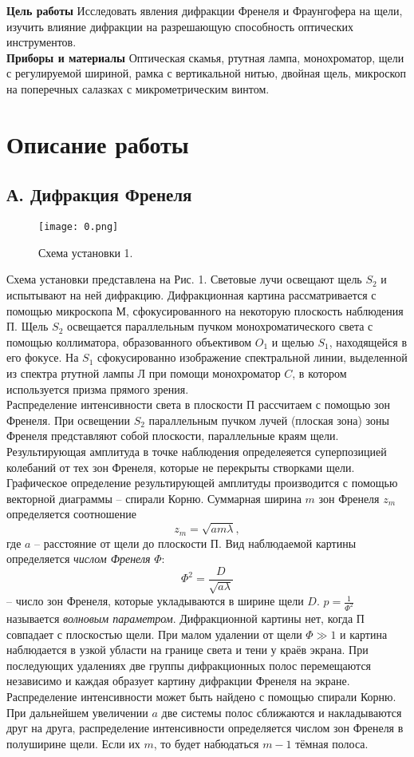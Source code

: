 




\noindent \textbf{Цель работы}
Исследовать явления дифракции Френеля и Фраунгофера на щели, изучить влияние дифракции на разрешающую способность оптических инструментов. \\
\textbf{Приборы и материалы}
Оптическая скамья, ртутная лампа, монохроматор, щели с регулируемой шириной, рамка с вертикальной нитью, двойная щель, микроскоп на поперечных салазках с микрометрическим винтом.

\section*{Описание работы}

\subsection*{А. Дифракция Френеля}
\begin{figure}[h]
	\texttt{[image: 0.png]}
	\centering
	\caption{Схема установки 1.}
\end{figure}
Схема установки представлена на Рис. 1. Световые лучи освещают щель $S_2$ и испытывают на ней дифракцию. Дифракционная картина рассматривается с помощью микроскопа М, сфокусированного на некоторую плоскость наблюдения П. Щель $S_2$ освещается параллельным пучком монохроматического света с помощью коллиматора, образованного объективом $O_1$ и щелью $S_1$, находящейся в его фокусе. На $S_1$ сфокусированно изображение спектральной линии, выделенной из спектра ртутной лампы Л при помощи монохроматор $C$, в котором используется призма прямого зрения. \\
Распределение интенсивности света в плоскости П рассчитаем с помощью зон Френеля. При освещении $S_2$ параллельным пучком лучей (плоская зона) зоны Френеля представляют собой плоскости, параллельные краям щели. Результирующая амплитуда в точке наблюдения определеяется суперпозицией колебаний от тех зон Френеля, которые не перекрыты створками щели. Графическое определение результирующей амплитуды производится с помощью векторной диаграммы -- спирали Корню. Суммарная ширина $m$ зон Френеля $z_m$ определяется соотношение
\begin{equation}
	z_m = \sqrt{am\lambda},
\end{equation}
где $a$ -- расстояние от щели до плоскости П. Вид наблюдаемой картины определяется \textit{числом Френеля} $\Phi$:
$$
	\Phi^2 = \dfrac{D}{\sqrt{a\lambda}}
$$
-- число зон Френеля, которые укладываются в ширине щели $D$. $p = \frac{1}{\Phi^2}$ называется \textit{волновым параметром}. Дифракционной картины нет, когда П совпадает с плоскостью щели. При малом удалении от щели $\Phi \gg 1$ и картина наблюдается в узкой убласти на границе света и тени у краёв экрана. При последующих удалениях две группы дифракционных полос перемещаются независимо и каждая образует картину дифракции Френеля на экране. Распределение интенсивности может быть найдено с помощью спирали Корню. При дальнейшем увеличении $a$ две системы полос сближаются и накладываются друг на друга, распределение интенсивности определяется числом зон Френеля в полуширине щели. Если их $m$, то будет набюдаться $m-1$ тёмная полоса.
